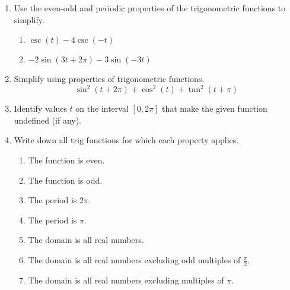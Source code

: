\begin{enumerate}
\item Use the even-odd and periodic properties of the trigonometric functions to simplify.
\begin{enumerate}
\item $\csc(t)-4\csc(-t)$\vfill
\item $-2\sin(3t+2\pi)-3\sin(-3t)$\vfill
\end{enumerate}

\vfill


\item Simplify using properties of trigonometric functions. $$\sin^2(t+2\pi)+\cos^2(t)+\tan^2(t+\pi)$$
\vfill

\clearpage
\item Identify values $t$ on the interval $[0,2\pi]$ that make the given function undefined (if any).
\begin{enumerate}
\end{enumerate}

\item Write down all trig functions for which each property applies.
\begin{enumerate}
\item The function is even.\vfill
\item The function is odd.\vfill
\item The period is $2\pi$.\vfill
\item The period is $\pi$.\vfill
\item The domain is all real numbers.\vfill
\item The domain is all real numbers excluding odd multiples of $\frac{\pi}{2}$.\vfill
\item The domain is all real numbers excluding multiples of $\pi$.\vfill
\end{enumerate}

\end{enumerate}

